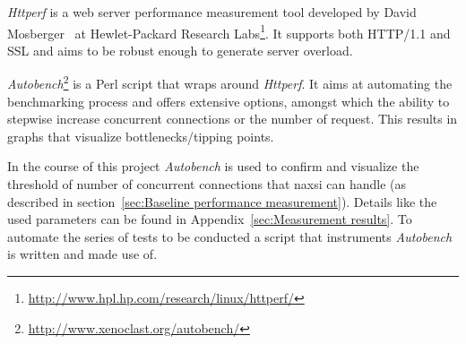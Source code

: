 \emph{Httperf} is a web server performance measurement tool developed by David Mosberger~\cite{mosberger1998httperf} at Hewlet-Packard Research Labs\footnote{\url{http://www.hpl.hp.com/research/linux/httperf/}}. It supports both HTTP/1.1 and SSL and aims to be robust enough to generate server overload.

\emph{Autobench}\footnote{\url{http://www.xenoclast.org/autobench/}} is a Perl script that wraps around \emph{Httperf}. It aims at automating the benchmarking process and offers extensive options, amongst which the ability to stepwise increase concurrent connections or the number of request. This results in graphs that visualize bottlenecks/tipping points.

In the course of this project \emph{Autobench} is used to confirm and visualize the threshold of number of concurrent connections that naxsi can handle (as described in section~\ref{sec:Baseline performance measurement}). Details like the used parameters can be found in Appendix~\ref{sec:Measurement results}. To automate the series of tests to be conducted a script that instruments \emph{Autobench} is written and made use of. 
